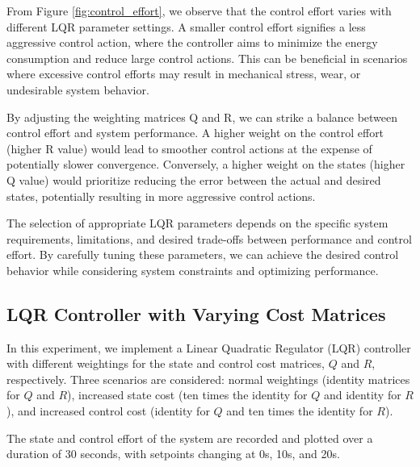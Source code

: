 \documentclass[11pt,twocolumn,twoside,lineno]{pnas-new}
\begin{document}
From Figure \ref{fig:control_effort}, we observe that the control effort varies with different LQR parameter settings. A smaller control effort signifies a less aggressive control action, where the controller aims to minimize the energy consumption and reduce large control actions. This can be beneficial in scenarios where excessive control efforts may result in mechanical stress, wear, or undesirable system behavior.

By adjusting the weighting matrices Q and R, we can strike a balance between control effort and system performance. A higher weight on the control effort (higher R value) would lead to smoother control actions at the expense of potentially slower convergence. Conversely, a higher weight on the states (higher Q value) would prioritize reducing the error between the actual and desired states, potentially resulting in more aggressive control actions.

The selection of appropriate LQR parameters depends on the specific system requirements, limitations, and desired trade-offs between performance and control effort. By carefully tuning these parameters, we can achieve the desired control behavior while considering system constraints and optimizing performance.

\subsection{LQR Controller with Varying Cost Matrices}
In this experiment, we implement a Linear Quadratic Regulator (LQR) controller with different weightings for the state and control cost matrices, $Q$ and $R$, respectively. Three scenarios are considered: normal weightings (identity matrices for $Q$ and $R$), increased state cost (ten times the identity for $Q$ and identity for $R$), and increased control cost (identity for $Q$ and ten times the identity for $R$).

The state and control effort of the system are recorded and plotted over a duration of 30 seconds, with setpoints changing at 0s, 10s, and 20s.
\end{document}
